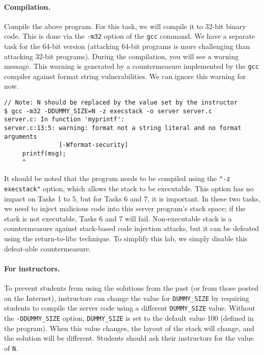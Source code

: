 \paragraph{Compilation.} Compile the above program. For this task,
we will compile it to 32-bit binary code. This is done via the
\texttt{-m32} option of the \texttt{gcc} command. 
We have a separate task for the 64-bit version (attacking 64-bit
programs is more challenging than attacking 32-bit programs).
During the compilation, you will see a
warning message. This warning is generated by a countermeasure implemented by
the \texttt{gcc} compiler against format string vulnerabilities. We can
ignore this warning for now. 


\begin{lstlisting}
// Note: N should be replaced by the value set by the instructor
$ gcc -m32 -DDUMMY_SIZE=N -z execstack -o server server.c
server.c: In function 'myprintf':
server.c:13:5: warning: format not a string literal and no format arguments 
               [-Wformat-security]
     printf(msg);
     ^
\end{lstlisting}

It should be noted that the program needs to be compiled using 
the \texttt{"-z execstack"} option, which allows the stack to be 
executable. This option has no impact on Tasks 1 to 5, but for 
Tasks 6 and 7, it is important. In these 
two tasks, we need to inject malicious code into this server program's stack space; 
if the  stack is not executable, Tasks 6 and 7 will fail. 
Non-executable stack is a countermeasure against stack-based 
code injection attacks, but 
it can be defeated using the return-to-libc technique. To simplify 
this lab, we simply disable this defeat-able countermeasure. 


\paragraph{For instructors.} 
To prevent students from using the solutions from the past (or from those 
posted on the Internet), instructors can change the 
value for \texttt{DUMMY\_SIZE} by requiring students to compile the 
server code using a different \texttt{DUMMY\_SIZE} value. 
Without the \texttt{-DDUMMY\_SIZE}  
option, \texttt{DUMMY\_SIZE} is set to the default value 100 (defined
in the program). 
When this value changes, the layout of the stack 
will change, and the solution will be different. 
Students should ask their instructors for
the value of \texttt{N}.





